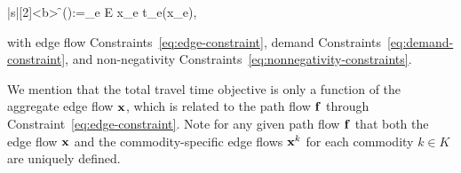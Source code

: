 \documentclass{article}
\begin{document}
\begin{definition} \label{def:so-tap}
\begin{mini!}|s|[2]<b>
	{\f }{\objso():=\sum_{e \in E} x_e t_e(x_e), \label{eq:so-obj}} %
	{}
	{}
\end{mini!}
with edge flow Constraints~\eqref{eq:edge-constraint}, demand Constraints~\eqref{eq:demand-constraint}, and non-negativity
Constraints~\eqref{eq:nonnegativity-constraints}.
\end{definition}
\begin{comment}
In this work we will consider several variants of the traffic assignment problem (TAP). The goal of the SO traffic assignment problem (SO-TAP) is to route users to minimize the total system travel time. This behavior is captured in the following convex program:
\begin{definition}[Program for SO-TAP \cite{Sheffi1985}] \label{def:so-tap}
\begin{mini!}|s|[2]<b>
	{\f \in \Omega}{\objso(\mathbf{x}):=\sum_{e \in E} x_e t_e(x_e), \label{eq:so-obj}} %
	{}
	{}
\end{mini!}
where $\f = \{\mathbf{x}_P: P \in \cup_{k \in K} \mathcal{P}_k  \}$ and $\Omega$ is the set of non-negative flows satisfying edge flow constraints, i.e., $\sum_{k \in K} \sum_{P \in \mathcal{P}_k: e \in P} \mathbf{x}_P = x_e$ for all $e \in E$, and demand constraints, i.e., $\sum_{P \in \mathcal{P}_k} \mathbf{x}_P = d_k$ for all $k \in K$.
\end{definition}
\end{comment}
We mention that the total travel time objective is only a function of the aggregate edge flow $\mathbf{x}$, which is related to the path flow $\mathbf{f}$ through Constraint~\eqref{eq:edge-constraint}. Note for any given path flow $\mathbf{f}$ that both the edge flow $\mathbf{x}$ and the commodity-specific edge flows $\mathbf{x}^k$ for each commodity $k \in K$ are uniquely defined.
\end{document}
